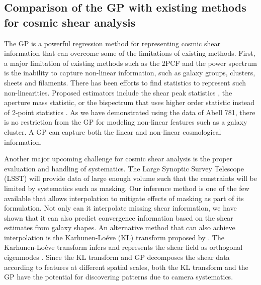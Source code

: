 \subsection{Comparison of the GP with existing methods for cosmic shear analysis}  
The GP is a powerful regression method for representing
cosmic shear information that can overcome some of the limitations of existing
methods. First, a major limitation of existing methods such as the 2PCF and the power
spectrum is the inability to capture non-linear information, 
such as galaxy groups, clusters, sheets and filaments.
There has been efforts to find statistics to represent such non-linearities.
Proposed estimators include the shear peak statistics 
\citep{Bard2014}, the aperture mass statistic, 
or the bispectrum that uses higher order statistic  
instead of 2-point statistics \citep{Kayo2012}.
As we have demonstrated using the data of Abell 781, 
there is no restriction from the
GP for modeling non-linear features such as a galaxy cluster. 
A GP can capture both the linear and non-linear cosmological information. 

Another major upcoming challenge for cosmic shear analysis is the proper
evaluation and handling of systematics. 
The Large Synoptic Survey Telescope (LSST) will
provide data of large enough volume such that the
constraints will be limited by systematics such as masking. 
Our inference method is one of the few available that allows interpolation 
to mitigate effects of masking as part of its formulation. Not only can it interpolate
missing shear information, we have shown that it can also predict convergence
information based on the shear estimates from galaxy shapes.
An alternative method that can also achieve interpolation 
is the Karhunen-Lo\'{e}ve (KL) transform proposed by \cite{VanderPlas2012a}. 
The Karhunen-Lo\'{e}ve transform infers and represents the shear field as 
orthogonal eigenmodes \citep{VanderPlas2012a}. 
Since the KL transform and GP decomposes the shear data according to features
at different spatial scales, both the KL transform and the GP have the potential 
for discovering patterns due to camera systematics.  


